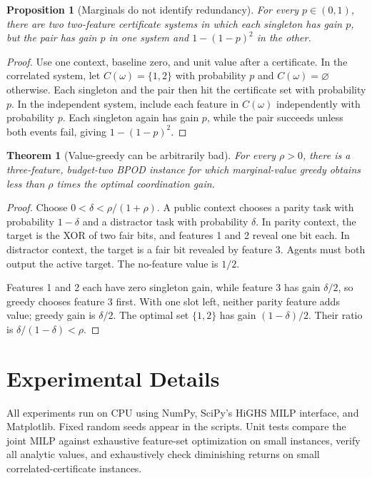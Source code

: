 \documentclass[11pt]{article}
\newtheorem{theorem}{Theorem}
\newtheorem{proposition}{Proposition}
\begin{document}
\begin{proposition}[Marginals do not identify redundancy]\label{prop:marginals-supp}
For every $p\in(0,1)$, there are two two-feature certificate systems in which each singleton has gain $p$, but the pair has gain $p$ in one system and $1-(1-p)^2$ in the other.
\end{proposition}
\begin{proof}
Use one context, baseline zero, and unit value after a certificate. In the correlated system, let $C(\omega)=\{1,2\}$ with probability $p$ and $C(\omega)=\varnothing$ otherwise. Each singleton and the pair then hit the certificate set with probability $p$. In the independent system, include each feature in $C(\omega)$ independently with probability $p$. Each singleton again has gain $p$, while the pair succeeds unless both events fail, giving $1-(1-p)^2$.
\end{proof}

\begin{theorem}[Value-greedy can be arbitrarily bad]\label{thm:greedy-supp}
For every $\rho>0$, there is a three-feature, budget-two BPOD instance for which marginal-value greedy obtains less than $\rho$ times the optimal coordination gain.
\end{theorem}
\begin{proof}
Choose $0<\delta<\rho/(1+\rho)$. A public context chooses a parity task with probability $1-\delta$ and a distractor task with probability $\delta$. In parity context, the target is the XOR of two fair bits, and features 1 and 2 reveal one bit each. In distractor context, the target is a fair bit revealed by feature 3. Agents must both output the active target. The no-feature value is $1/2$.

Features 1 and 2 each have zero singleton gain, while feature 3 has gain $\delta/2$, so greedy chooses feature 3 first. With one slot left, neither parity feature adds value; greedy gain is $\delta/2$. The optimal set $\{1,2\}$ has gain $(1-\delta)/2$. Their ratio is $\delta/(1-\delta)<\rho$.
\end{proof}

\section{Experimental Details}
All experiments run on CPU using NumPy, SciPy's HiGHS MILP interface, and Matplotlib. Fixed random seeds appear in the scripts. Unit tests compare the joint MILP against exhaustive feature-set optimization on small instances, verify all analytic values, and exhaustively check diminishing returns on small correlated-certificate instances.
\end{document}
